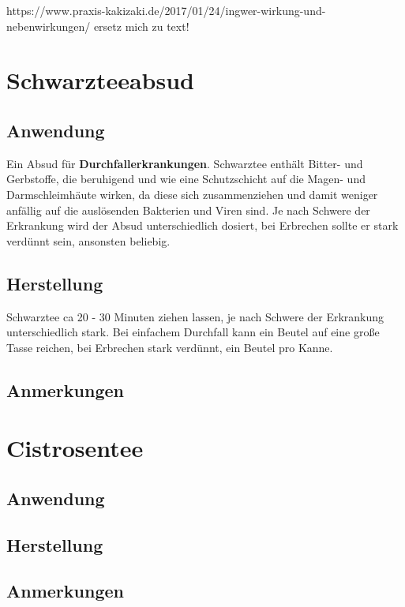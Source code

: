 https://www.praxis-kakizaki.de/2017/01/24/ingwer-wirkung-und-nebenwirkungen/
ersetz mich zu text!




\section{Schwarzteeabsud}

\subsection{Anwendung}

Ein Absud für \textbf{Durchfallerkrankungen}. Schwarztee enthält Bitter- und Gerbstoffe, die beruhigend und wie eine Schutzschicht auf die Magen- und Darmschleimhäute wirken, da diese sich zusammenziehen und damit weniger anfällig auf die auslösenden Bakterien und Viren sind. Je nach Schwere der Erkrankung wird der Absud unterschiedlich dosiert, bei Erbrechen sollte er stark verdünnt sein, ansonsten beliebig.

\subsection{Herstellung}

Schwarztee ca 20 - 30 Minuten ziehen lassen, je nach Schwere der Erkrankung unterschiedlich stark. Bei einfachem Durchfall kann ein Beutel auf eine große Tasse reichen, bei Erbrechen stark verdünnt, ein Beutel pro Kanne.

\subsection{Anmerkungen}





\section{Cistrosentee}

\subsection{Anwendung}

\subsection{Herstellung}

\subsection{Anmerkungen}





